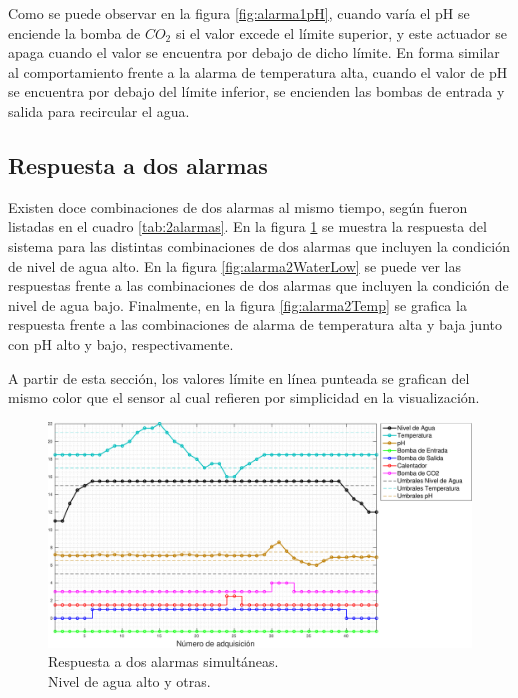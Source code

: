 Como se puede observar en la figura \ref{fig:alarma1pH}, cuando varía el pH se enciende la bomba de $CO_2$ si el valor excede el límite superior, y este actuador se apaga cuando el valor se encuentra por debajo de dicho límite.  En forma similar al comportamiento frente a la alarma de temperatura alta, cuando el valor de pH se encuentra por debajo del límite inferior, se encienden las bombas de entrada y salida para recircular el agua.

\subsection{Respuesta a dos alarmas}
\label{sec:2alarma}

Existen doce combinaciones de dos alarmas al mismo tiempo, según fueron listadas en el cuadro \ref{tab:2alarmas}. En la figura \ref{fig:alarma2WaterHigh} se muestra la respuesta del sistema para las distintas combinaciones de dos alarmas que incluyen la condición de nivel de agua alto.  En la figura \ref{fig:alarma2WaterLow} se puede ver las respuestas frente a las combinaciones de dos alarmas que incluyen la condición de nivel de agua bajo. Finalmente, en la figura \ref{fig:alarma2Temp} se grafica la respuesta frente a las combinaciones de alarma de temperatura alta y baja junto con pH alto y bajo, respectivamente.

A partir de esta sección, los valores límite en línea punteada se grafican del mismo color que el sensor al cual refieren por simplicidad en la visualización.

\begin{figure}[h]
\centering
    \includegraphics[width=\textwidth]{./Figures/plot2waterHigh.pdf}
	\caption{Respuesta a dos alarmas simultáneas.\\ Nivel de agua alto y otras.}
	\label{fig:alarma2WaterHigh}
\end{figure}


